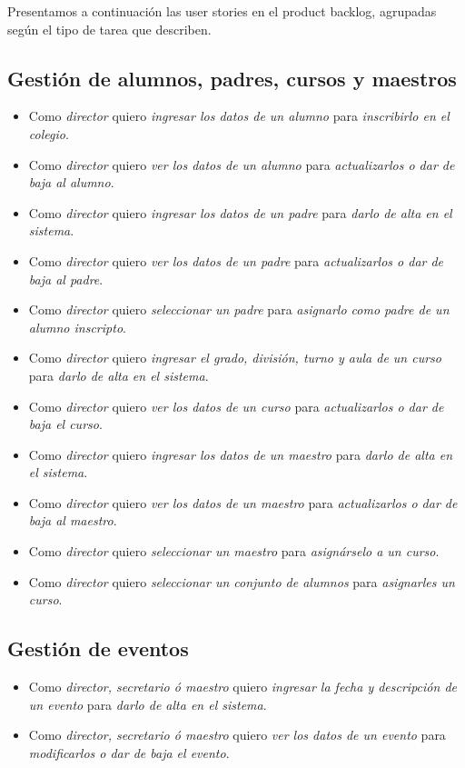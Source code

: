 \documentclass[a4paper, 10pt, twoside]{article}
\newenvironment{stories}{
  \begin{itemize}
}{
  \end{itemize}
}
\newcommand{\story}[3]{
  \item
  Como \emph{#1} quiero \emph{#2} para \emph{#3}.
}
\begin{document}
Presentamos a continuación las user stories en el product backlog, agrupadas según el tipo de tarea que describen.


\subsection{Gestión de alumnos, padres, cursos y maestros}

\begin{stories}
  \story{director}
        {ingresar los datos de un alumno}
        {inscribirlo en el colegio}

  \story{director}
        {ver los datos de un alumno}
        {actualizarlos o dar de baja al alumno}

  \story{director}
        {ingresar los datos de un padre}
        {darlo de alta en el sistema}

  \story{director}
        {ver los datos de un padre}
        {actualizarlos o dar de baja al padre}
       
  \story{director}
        {seleccionar un padre}
        {asignarlo como padre de un alumno inscripto}

  \story{director}
        {ingresar el grado, división, turno y aula de un curso}
        {darlo de alta en el sistema}

  \story{director}
        {ver los datos de un curso}
        {actualizarlos o dar de baja el curso}

  \story{director}
        {ingresar los datos de un maestro}
        {darlo de alta en el sistema}

  \story{director}
        {ver los datos de un maestro}
        {actualizarlos o dar de baja al maestro}

  \story{director}
        {seleccionar un maestro}
        {asignárselo a un curso}

  \story{director}
        {seleccionar un conjunto de alumnos}
        {asignarles un curso}
\end{stories}


\subsection{Gestión de eventos}

\begin{stories}
  \story{director, secretario ó maestro}
        {ingresar la fecha y descripción de un evento}
        {darlo de alta en el sistema}

  \story{director, secretario ó maestro}
        {ver los datos de un evento}
        {modificarlos o dar de baja el evento}
\end{stories}
\end{document}
